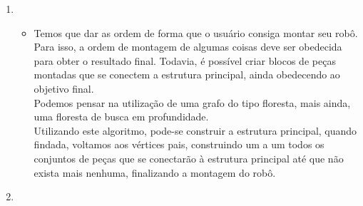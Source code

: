 \documentclass[11pt,reqno]{amsart}
\begin{document}
\begin{enumerate}
		\item

		\begin{itemize}
			\item Temos que dar as ordem de forma que o usuário consiga montar seu robô. Para isso, a ordem de montagem de 
			algumas coisas deve ser obedecida para obter o resultado final. Todavia, é possível criar blocos de peças montadas 
			que se conectem a estrutura principal, ainda obedecendo ao objetivo final. \\ Podemos pensar na utilização de uma 
			grafo do tipo floresta, mais ainda, uma floresta de busca em profundidade. \\ Utilizando este algoritmo, pode-se 
			construir a estrutura principal, quando findada, voltamos aos vértices pais, construindo um a um todos os 
			conjuntos de peças que se conectarão à estrutura principal até que não exista mais nenhuma, finalizando a montagem 
			do robô.
		\end{itemize}
		\vspace{0.4cm}

		\item


\end{enumerate}
\end{document}

